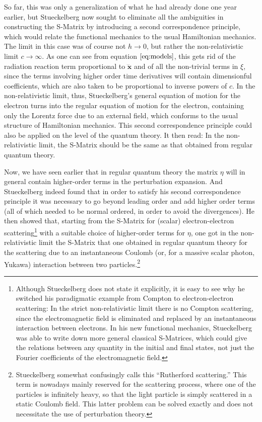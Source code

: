 \documentclass[12pt]{article}
\begin{document}
So far, this was only a generalization of what he had already done one year earlier, but Stueckelberg now sought to eliminate all the ambiguities in constructing the S-Matrix by introducing a second correspondence principle, which would relate the functional mechanics to the usual Hamiltonian mechanics. The limit in this case was of course not $h \rightarrow 0$, but rather the non-relativistic limit $c \rightarrow \infty$. As one can see from equation $\ref{eq:models}$, this gets rid of the radiation reaction term proportional to $\dddot{\mathbf{x}}$ and of all the non-trivial terms in $\xi$, since the terms involving higher order time derivatives will contain dimensionful coefficients, which are also taken to be proportional to inverse powers of $c$. In the non-relativistic limit, thus, Stueckelberg's general equation of motion for the electron turns into the regular equation of motion for the electron, containing only the Lorentz force due to an external field, which conforms to the usual structure of Hamiltonian mechanics. This second correspondence principle could also be applied on the level of the quantum theory. It then read: In the non-relativistic limit, the S-Matrix should be the same as that obtained from regular quantum theory.

Now, we have seen earlier that in regular quantum theory the matrix $\eta$ will in general contain higher-order terms in the perturbation expansion. And Stueckelberg indeed found that in order to satisfy his second correspondence principle it was necessary to go beyond leading order and add higher order terms (all of which needed to be normal ordered, in order to avoid the divergences). He then showed that, starting from the S-Matrix for (scalar) electron-electron scattering\footnote{Although Stueckelberg does not state it explicitly, it is easy to see why he switched his paradigmatic example from Compton to electron-electron scattering: In the strict non-relativistic limit there is no Compton scattering, since the electromagnetic field is eliminated and replaced by an instantaneous interaction between electrons. In his  new functional mechanics, Stueckelberg was able to write down more general classical S-Matrices, which could give the relations between any quantity in the initial and final states, not just the Fourier coefficients of the electromagnetic field.} with a suitable choice of higher-order terms for $\eta$, one got in the non-relativistic limit the S-Matrix that one obtained in regular quantum theory for the scattering due to an instantaneous Coulomb (or, for a massive scalar photon, Yukawa) interaction between two particles.\footnote{Stueckelberg somewhat confusingly calls this ``Rutherford scattering.'' This term is nowadays mainly reserved for the scattering process, where one of the particles is infinitely heavy, so that the light particle is simply scattered in a static Coulomb field. This latter problem can be solved exactly and does not necessitate the use of perturbation theory.}
\end{document}
